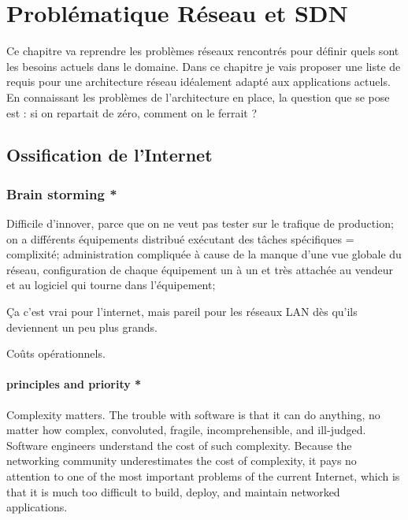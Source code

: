 \chapter{Problématique Réseau et SDN}
\label{chap-1}



Ce chapitre va reprendre les problèmes réseaux rencontrés pour définir quels sont les besoins actuels dans le domaine. Dans ce chapitre je vais proposer une liste de requis pour une architecture réseau idéalement adapté aux applications actuels.
En connaissant les problèmes de l'architecture en place, la question que se pose est : si on repartait de zéro, comment on le ferrait ?

\section{Ossification de l'Internet}


\subsection*{Brain storming *}
Difficile d'innover, parce que on ne veut pas tester sur le trafique de production; on a différents équipements distribué exécutant des tâches spécifiques = complixité; administration compliquée à cause de la manque d'une vue globale du réseau,  configuration de chaque équipement un à un et très attachée au vendeur et au logiciel qui tourne dans l'équipement;  
\par
Ça c'est vrai pour l'internet, mais pareil pour les réseaux LAN dès qu'ils deviennent un peu plus grands.
\par
Coûts opérationnels. 

\subsubsection{principles and priority *}
Complexity matters. The trouble with software is that it can do anything, no matter how complex, convoluted, fragile, incomprehensible, and ill-judged.
Software engineers understand the cost of such complexity. Because the networking community underestimates the cost of complexity, it pays no attention to one of the most important problems of the current Internet, which is that it is much too difficult to build, deploy, and maintain networked applications.


